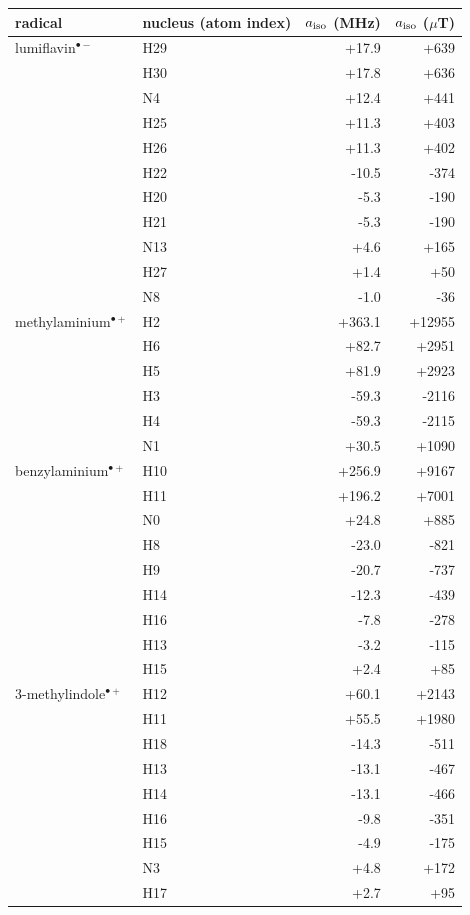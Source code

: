 \small\begin{tabular}{llrr}
\toprule
radical & nucleus (atom index) & $a_{\rm iso}$ (MHz) & $a_{\rm iso}$ ($\mu$T) \\
\midrule
lumiflavin$^{\bullet-}$ & H29 & +17.9 & +639 \\
 & H30 & +17.8 & +636 \\
 & N4 & +12.4 & +441 \\
 & H25 & +11.3 & +403 \\
 & H26 & +11.3 & +402 \\
 & H22 & -10.5 & -374 \\
 & H20 & -5.3 & -190 \\
 & H21 & -5.3 & -190 \\
 & N13 & +4.6 & +165 \\
 & H27 & +1.4 & +50 \\
 & N8 & -1.0 & -36 \\
methylaminium$^{\bullet+}$ & H2 & +363.1 & +12955 \\
 & H6 & +82.7 & +2951 \\
 & H5 & +81.9 & +2923 \\
 & H3 & -59.3 & -2116 \\
 & H4 & -59.3 & -2115 \\
 & N1 & +30.5 & +1090 \\
benzylaminium$^{\bullet+}$ & H10 & +256.9 & +9167 \\
 & H11 & +196.2 & +7001 \\
 & N0 & +24.8 & +885 \\
 & H8 & -23.0 & -821 \\
 & H9 & -20.7 & -737 \\
 & H14 & -12.3 & -439 \\
 & H16 & -7.8 & -278 \\
 & H13 & -3.2 & -115 \\
 & H15 & +2.4 & +85 \\
3-methylindole$^{\bullet+}$ & H12 & +60.1 & +2143 \\
 & H11 & +55.5 & +1980 \\
 & H18 & -14.3 & -511 \\
 & H13 & -13.1 & -467 \\
 & H14 & -13.1 & -466 \\
 & H16 & -9.8 & -351 \\
 & H15 & -4.9 & -175 \\
 & N3 & +4.8 & +172 \\
 & H17 & +2.7 & +95 \\
\bottomrule
\end{tabular}
